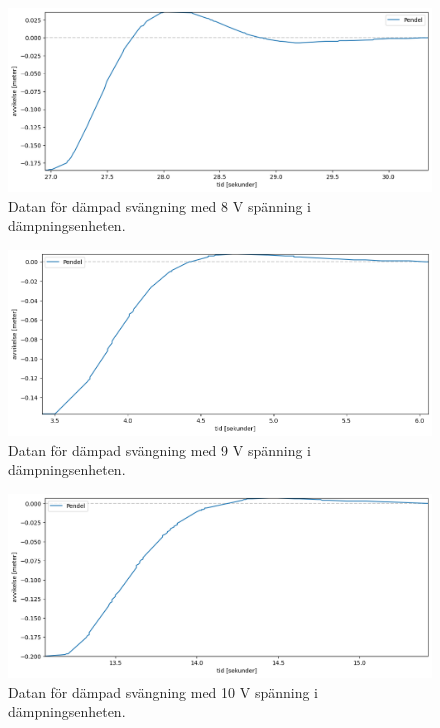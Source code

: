 \documentclass[12pt, a4paper]{article}
\begin{document}
\begin{figure}[hp]
    \includegraphics[width=\textwidth]{graf_8_v_centered.png}
    \caption{Datan för dämpad svängning med 8 V spänning i dämpningsenheten.}
    \label{fig:data_8_v}
\end{figure}

\begin{figure}[hp]
    \includegraphics[width=\textwidth]{graf_9_v_centered.png}
    \caption{Datan för dämpad svängning med 9 V spänning i dämpningsenheten.}
    \label{fig:data_9_v}
\end{figure}

\begin{figure}[hp]
    \includegraphics[width=\textwidth]{graf_10_v_centered.png}
    \caption{Datan för dämpad svängning med 10 V spänning i dämpningsenheten.}
    \label{fig:data_10_v}
\end{figure}
\end{document}
